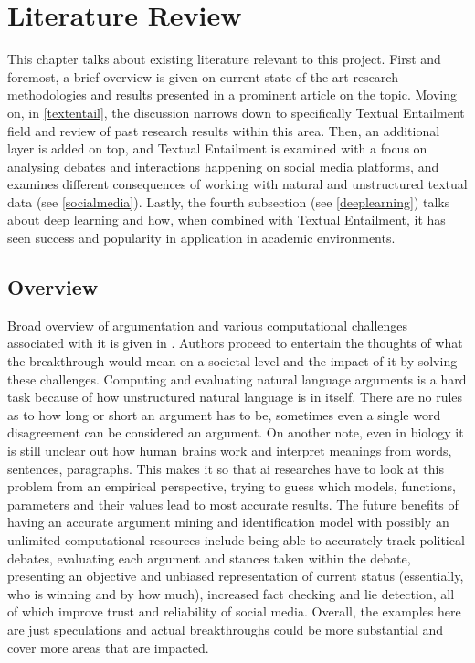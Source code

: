 \section{Literature Review}
    This chapter talks about existing literature relevant to this project. First and foremost, a brief overview is given on current state of the art research methodologies and results presented in a prominent article on the topic. Moving on, in \cref{textentail}, the discussion narrows down to specifically Textual Entailment field and review of past research results within this area. Then, an additional layer is added on top, and Textual Entailment is examined with a focus on analysing debates and interactions happening on social media platforms, and examines different consequences of working with natural and unstructured textual data (see \cref{socialmedia}). Lastly, the fourth subsection (see \cref{deeplearning}) talks about deep learning and how, when combined with Textual Entailment, it has seen success and popularity in application in academic environments.

    \subsection{Overview}
        Broad overview of argumentation and various computational challenges associated with it is given in \autocite{Lippi2016ArgumentationMS}. Authors proceed to entertain the thoughts of what the breakthrough would mean on a societal level and the impact of it by solving these challenges. Computing and evaluating natural language arguments is a hard task because of how unstructured natural language is in itself. There are no rules as to how long or short an argument has to be, sometimes even a single word disagreement can be considered an argument. On another note, even in biology it is still unclear out how human brains work and interpret meanings from words, sentences, paragraphs. This makes it so that \gls{ai} researches have to look at this problem from an empirical perspective, trying to guess which models, functions, parameters and their values lead to most accurate results. The future benefits of having an accurate argument mining and identification model with possibly an unlimited computational resources include being able to accurately track political debates, evaluating each argument and stances taken within the debate, presenting an objective and unbiased representation of current status (essentially, who is winning and by how much), increased fact checking and lie detection, all of which improve trust and reliability of social media. Overall, the examples here are just speculations and actual breakthroughs could be more substantial and cover more areas that are impacted.
        
